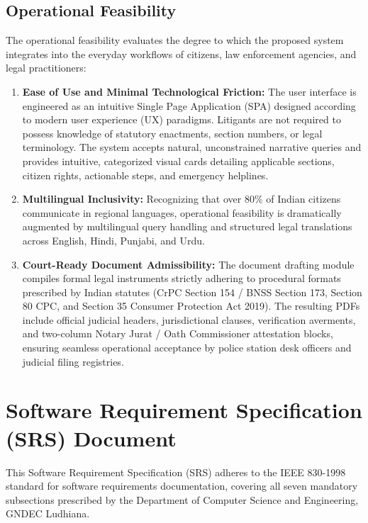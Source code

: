 \subsection{Operational Feasibility}
The operational feasibility evaluates the degree to which the proposed system integrates into the everyday workflows of citizens, law enforcement agencies, and legal practitioners:
\begin{enumerate}
    \item \textbf{Ease of Use and Minimal Technological Friction:}
    The user interface is engineered as an intuitive Single Page Application (SPA) designed according to modern user experience (UX) paradigms. Litigants are not required to possess knowledge of statutory enactments, section numbers, or legal terminology. The system accepts natural, unconstrained narrative queries and provides intuitive, categorized visual cards detailing applicable sections, citizen rights, actionable steps, and emergency helplines.
    
    \item \textbf{Multilingual Inclusivity:}
    Recognizing that over 80\% of Indian citizens communicate in regional languages, operational feasibility is dramatically augmented by multilingual query handling and structured legal translations across English, Hindi, Punjabi, and Urdu.
    
    \item \textbf{Court-Ready Document Admissibility:}
    The document drafting module compiles formal legal instruments strictly adhering to procedural formats prescribed by Indian statutes (CrPC Section 154 / BNSS Section 173, Section 80 CPC, and Section 35 Consumer Protection Act 2019). The resulting PDFs include official judicial headers, jurisdictional clauses, verification averments, and two-column Notary Jurat / Oath Commissioner attestation blocks, ensuring seamless operational acceptance by police station desk officers and judicial filing registries.
\end{enumerate}

\section{Software Requirement Specification (SRS) Document}
\label{sec:srs_document}

This Software Requirement Specification (SRS) adheres to the IEEE 830-1998 standard for software requirements documentation, covering all seven mandatory subsections prescribed by the Department of Computer Science and Engineering, GNDEC Ludhiana.


